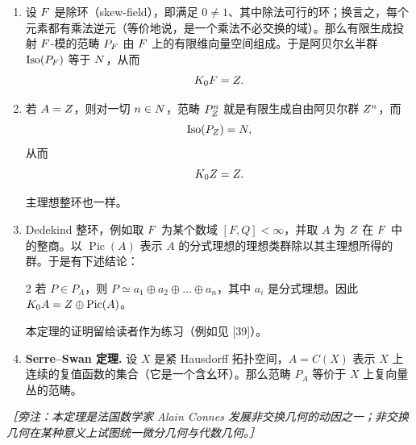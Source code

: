 \begin{enumerate}[label=\arabic*.]
\item 设 $F$ 是除环（skew-field），即满足 $0 \ne 1$、其中除法可行的环；换言之，每个元素都有乘法逆元（等价地说，是一个乘法不必交换的域）。那么有限生成投射 $F$-模的范畴 $P_{F}$ 由 $F$ 上的有限维向量空间组成。于是阿贝尔幺半群 $\operatorname{Iso}(P_{F})$ 等于 $N$，从而
\[ K_0F = Z. \]

\item 若 $A = Z$，则对一切 $n \in N$，范畴 $P^n_{Z}$ 就是有限生成自由阿贝尔群 $Z^n$，而
\[ \operatorname{Iso}(P_{Z}) = N, \]
从而
\[ K_0Z = Z. \]

主理想整环也一样。

\item Dedekind 整环，例如取 $F$ 为某个数域 $[F, Q] < \infty$，并取 $A$ 为 $Z$ 在 $F$ 中的整商。以 $\operatorname{Pic}(A)$ 表示 $A$ 的分式理想的理想类群除以其主理想所得的群。于是有下述结论：

\begin{thm}{2} 若 $P \in P_A$，则 $P \simeq a_1 \oplus a_2 \oplus \dots \oplus a_n$，其中 $a_i$ 是分式理想。因此 $K_0A = Z \oplus \operatorname{Pic}(A)$。\end{thm}

本定理的证明留给读者作为练习（例如见 [39]）。

\item \textbf{Serre--Swan 定理.} 设 $X$ 是紧 Hausdorff 拓扑空间，$A = C(X)$ 表示 $X$ 上连续的复值函数的集合（它是一个含幺环）。那么范畴 $P_A$ 等价于 $X$ 上复向量丛的范畴。

\end{enumerate}

\emph{［旁注：本定理是法国数学家 Alain Connes 发展非交换几何的动因之一；非交换几何在某种意义上试图统一微分几何与代数几何。］}

